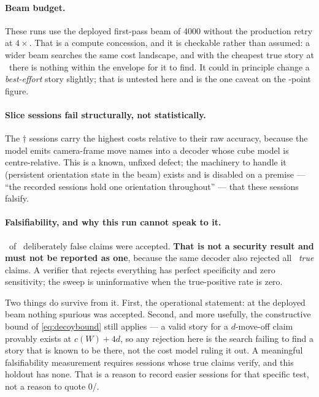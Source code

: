 \paragraph{Beam budget.} These runs use the deployed first-pass beam of
4000 without the production retry at $4\times$. That is a compute
concession, and it is checkable rather than assumed: a wider beam searches
the same cost landscape, and with the cheapest true story at
\MinGtPathCost\ there is nothing within the envelope for it to find. It
could in principle change a \emph{best-effort} story slightly; that is
untested here and is the one caveat on the \DecodeGain-point figure.

\paragraph{Slice sessions fail structurally, not statistically.} The
$\dagger$ sessions carry the highest costs relative to their raw accuracy,
because the model emits camera-frame move names into a decoder whose cube
model is centre-relative. This is a known, unfixed defect; the machinery to
handle it (persistent orientation state in the beam) exists and is disabled
on a premise --- ``the recorded sessions hold one orientation throughout'' ---
that these sessions falsify.

\paragraph{Falsifiability, and why this run cannot speak to it.}
\DecoyAccepted\ of \DecoyTried\ deliberately false claims were accepted.
\textbf{That is not a security result and must not be reported as one},
because the same decoder also rejected all \DecodeTrials\ \emph{true}
claims. A verifier that rejects everything has perfect specificity and zero
sensitivity; the sweep is uninformative when the true-positive rate is zero.

Two things do survive from it. First, the operational statement: at the
deployed beam nothing spurious was accepted. Second, and more usefully, the
constructive bound of \cref{eq:decoybound} still applies --- a valid story
for a $d$-move-off claim provably exists at $c(W) + 4d$, so any rejection
here is the search failing to find a story that is known to be there, not
the cost model ruling it out. A meaningful falsifiability measurement
requires sessions whose true claims verify, and this holdout has none. That
is a reason to record easier sessions for that specific test, not a reason
to quote 0/\DecoyTried.

